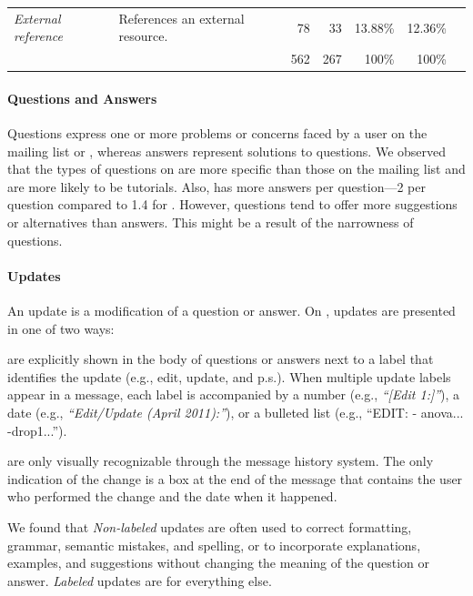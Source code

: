 \begin{table}[!htb]
\begin{small}
\begin{tabular}[h]{p{2.3cm}p{10.3cm}rrrrr}
  \emph{External reference}     & References an external resource.                                                                                                                         & 78           & 33               & 13.88\%        & 12.36\%        \\\cline{3-6}
                                &                                                                                                                                                          &{562}  & {267}     & {100\%} & {100\%} \\
  \bottomrule
        \end{tabular}
      \end{small}
      \label{table:type-of-knowledge}
\vspace{-3mm}
    \end{table}

\paragraph*{Questions and Answers}
    Questions express one or more problems or concerns faced by a user on the \RH mailing list or \SO, whereas answers represent solutions to questions.  We observed that the types of questions on \SO are more specific than those on the \RH mailing list and are more likely to be tutorials. Also, \SO has more answers per question---2 per question compared to 1.4 for \RH. However, \RH questions tend to offer more suggestions or alternatives than \SO answers. This might be a result of the narrowness of \SO questions.

\paragraph*{Updates}
An update is a modification of a question or answer. On \SO, updates are presented in one of two ways:
\begin{description}[itemsep=3pt, topsep=2pt, leftmargin=1em, parsep=0pt]
\item[Labeled updates] are explicitly shown in the body of questions or answers next to a label that identifies the update (e.g., edit, update, and p.s.).
  When multiple update labels appear in a message, each label is accompanied by a number (e.g., \textit{``[Edit 1:]''}), a date (e.g., \textit{``Edit/Update (April 2011):''}), or a bulleted list
  (e.g., ``EDIT: - anova... -drop1...'').

\item[Non-labeled updates] are only visually recognizable through the message history system. The only indication of the change is a box at the end of the
  message that contains the user who performed the change and the date when it happened.
\end{description}
We found that \textit{Non-labeled} updates are often used to correct formatting, grammar, semantic mistakes, and spelling, or to incorporate explanations, examples, and suggestions without changing the meaning of the question or answer. \textit{Labeled} updates are for everything else.

